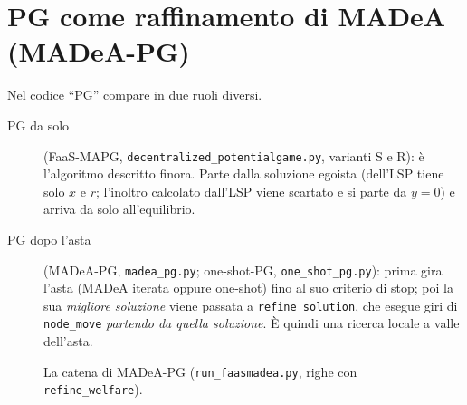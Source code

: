 \documentclass[11pt,a4paper]{article}
\newcommand{\code}[1]{\texttt{#1}}
\begin{document}
\section{PG come raffinamento di MADeA (MADeA-PG)}

Nel codice ``PG'' compare in due ruoli diversi.

\begin{description}
\item[PG da solo] (FaaS-MAPG, \code{decentralized\_potentialgame.py}, varianti
  S e R): \`e l'algoritmo descritto finora. Parte dalla soluzione egoista
  (dell'LSP tiene solo $x$ e $r$; l'inoltro calcolato dall'LSP viene
  scartato e si parte da $y = 0$) e arriva da solo all'equilibrio.
\item[PG dopo l'asta] (MADeA-PG, \code{madea\_pg.py}; one-shot-PG,
  \code{one\_shot\_pg.py}): prima gira l'asta (MADeA iterata oppure
  one-shot) fino al suo criterio di stop; poi la sua \emph{migliore soluzione}
  viene passata a \code{refine\_solution}, che esegue giri di
  \code{node\_move} \emph{partendo da quella soluzione}. \`E quindi una
  ricerca locale a valle dell'asta.
\end{description}

\begin{figure}[ht]
\centering
{}
\caption{La catena di MADeA-PG (\code{run\_faasmadea.py}, righe con
\code{refine\_welfare}).}
\end{figure}
\end{document}
